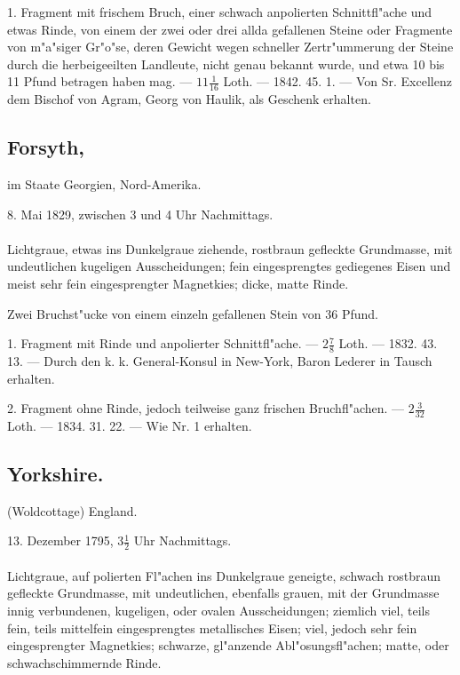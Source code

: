 \documentclass[a4paper, 11pt, oneside, polutonikogreek, german]{article}
\begin{document}
1. Fragment mit frischem Bruch, einer schwach anpolierten Schnittfl"ache und etwas Rinde, von einem der zwei oder drei allda gefallenen Steine oder Fragmente von m"a"siger Gr"o"se, deren Gewicht wegen schneller Zertr"ummerung der Steine durch die herbeigeeilten Landleute, nicht genau bekannt wurde, und etwa 10 bis 11 Pfund betragen haben mag. --- $11\frac{1}{16}$ Loth. --- 1842. 45. 1. --- Von Sr. Excellenz dem Bischof von Agram, Georg von Haulik, als Geschenk erhalten.
\subsection[Forsyth.]{Forsyth,}
\begin{center}
\small
im Staate Georgien, Nord-Amerika.

8. Mai 1829, zwischen 3 und 4 Uhr Nachmittags.
\end{center}
\paragraph{}
Lichtgraue, etwas ins Dunkelgraue ziehende, rostbraun gefleckte Grundmasse, mit undeutlichen kugeligen Ausscheidungen; fein eingesprengtes gediegenes Eisen und meist sehr fein eingesprengter Magnetkies; dicke, matte Rinde.

Zwei Bruchst"ucke von einem einzeln gefallenen Stein von 36 Pfund.

1. Fragment mit Rinde und anpolierter Schnittfl"ache. --- $2\frac{7}{8}$ Loth. --- 1832. 43. 13. --- Durch den k. k. General-Konsul in New-York, Baron Lederer in Tausch erhalten.

2. Fragment ohne Rinde, jedoch teilweise ganz frischen Bruchfl"achen. --- $2\frac{3}{32}$ Loth. --- 1834. 31. 22. --- Wie Nr. 1 erhalten.
\subsection{Yorkshire.}
\begin{center}
\small
(Woldcottage) England.

13. Dezember 1795, $3\frac{1}{2}$ Uhr Nachmittags.
\end{center}
\paragraph{}
Lichtgraue, auf polierten Fl"achen ins Dunkelgraue geneigte, schwach rostbraun gefleckte Grundmasse, mit undeutlichen, ebenfalls grauen, mit der Grundmasse innig verbundenen, kugeligen, oder ovalen Ausscheidungen; ziemlich viel, teils fein, teils mittelfein eingesprengtes metallisches Eisen; viel, jedoch sehr fein eingesprengter Magnetkies; schwarze, gl"anzende Abl"osungsfl"achen; matte, oder schwachschimmernde Rinde.
\end{document}
